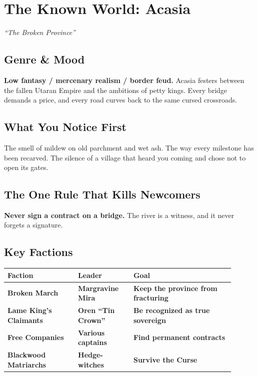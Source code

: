 \documentclass[10pt,twocolumn]{article} %
\begin{document}
\section{The Known World: Acasia}
\textit{``The Broken Province''}

\subsection{Genre \& Mood}
\textbf{Low fantasy / mercenary realism / border feud.} Acasia festers between the fallen Utaran Empire and the ambitions of petty kings. Every bridge demands a price, and every road curves back to the same cursed crossroads.

\subsection{What You Notice First}
The smell of mildew on old parchment and wet ash. The way every milestone has been recarved. The silence of a village that heard you coming and chose not to open its gates.

\subsection{The One Rule That Kills Newcomers}
\textbf{Never sign a contract on a bridge.} The river is a witness, and it never forgets a signature.

\subsection{Key Factions}
\begin{coretable}
\begin{tabular}{>{\bfseries}p{0.28\linewidth} >{\bfseries}p{0.22\linewidth} >{\bfseries}p{0.4\linewidth}}
\toprule
\textbf{Faction} & \textbf{Leader} & \textbf{Goal} \\
\midrule
Broken March & Margravine Mira & Keep the province from fracturing \\
Lame King's Claimants & Oren ``Tin Crown'' & Be recognized as true sovereign \\
Free Companies & Various captains & Find permanent contracts \\
Blackwood Matriarchs & Hedge-witches & Survive the Curse \\
\bottomrule
\end{tabular}
\end{coretable}
\end{document}
